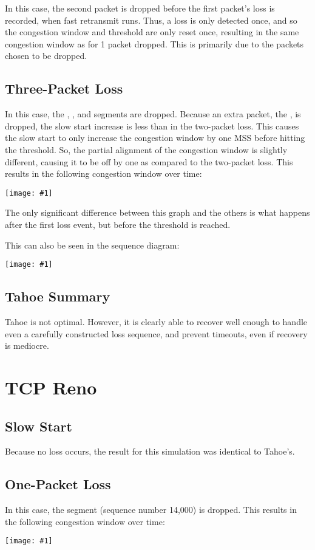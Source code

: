 \documentclass[fleqn,11pt]{article}
\newcommand{\graph}[2]{\begin{center}\texttt{[image: \#1]}\end{center}}
\newcommand{\cwnd}[1]{\graph{#1/cwnd}{height=3.5in}}
\newcommand{\sequence}[1]{\graph{#1/sequence}{}}
\begin{document}
In this case, the second packet is dropped before the first packet's loss is recorded, when fast retransmit runs.
Thus, a loss is only detected once, and so the congestion window and threshold are only reset once, resulting in the same congestion window as for 1 packet dropped.
This is primarily due to the packets chosen to be dropped.

\subsection{Three-Packet Loss}
In this case, the , , and  segments are dropped.
Because an extra packet, the , is dropped, the slow start increase is less than in the two-packet loss.
This causes the slow start to only increase the congestion window by one MSS before hitting the threshold.
So, the partial alignment of the congestion window is slightly different, causing it to be off by one as compared to the two-packet loss.
This results in the following congestion window over time:
\cwnd{tahoe-3}

The only significant difference between this graph and the others is what happens after the first loss event, but before the threshold is reached.

This can also be seen in the sequence diagram:
\sequence{tahoe-3}

\subsection{Tahoe Summary}

Tahoe is not optimal.
However, it is clearly able to recover well enough to handle even a carefully constructed loss sequence, and prevent timeouts, even if recovery is mediocre.


\section{TCP Reno}
\subsection{Slow Start}
Because no loss occurs, the result for this simulation was identical to Tahoe's.

\subsection{One-Packet Loss}
In this case, the  segment (sequence number 14,000) is dropped.
This results in the following congestion window over time:
\cwnd{reno-1}
\end{document}
